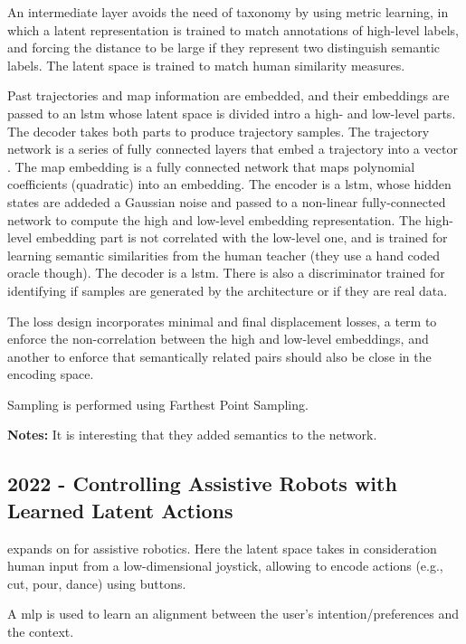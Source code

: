 An intermediate layer avoids the need of taxonomy  by using metric learning, in which a latent representation is trained to match annotations of high-level labels, and forcing the distance to be large if they represent two distinguish semantic labels.
%
The latent space is trained to match human similarity measures.

Past trajectories and map information are embedded, and their embeddings are passed to an \gls{lstm} whose latent space is divided intro a high- and low-level parts. The decoder takes both parts to produce trajectory samples.
%
The trajectory network is a series of fully connected layers that embed a trajectory into a vector \cite{alahi2016social} .
%
The map embedding is a fully connected network that maps polynomial coefficients (quadratic) into an embedding.
%
The encoder is a \gls{lstm}, whose hidden states are addeded a Gaussian noise and passed to a non-linear fully-connected network to compute the high and low-level embedding representation. The high-level embedding part is not correlated with the low-level one, and is trained for learning semantic similarities from the human teacher (they use a hand coded oracle though).
%
The decoder is a \gls{lstm}.
%
There is also a discriminator trained for identifying if samples are generated by the architecture or if they are real data.

The loss design incorporates minimal and final displacement losses, a term to enforce the non-correlation between the high and low-level embeddings, and another to enforce that semantically related pairs should also be close in the encoding space.

Sampling is performed using Farthest Point Sampling.

\textbf{Notes:} It is interesting that they added semantics to the network.

\subsection*{2022 - Controlling Assistive Robots with Learned Latent Actions}

\cite{losey2022learning} expands on \cite{losey2020controlling} for assistive robotics. Here the latent space takes in consideration human input from a low-dimensional joystick, allowing to encode actions (e.g., cut, pour, dance) using buttons.

A \gls{mlp} is used to learn an alignment between the user's intention/preferences and the context.

